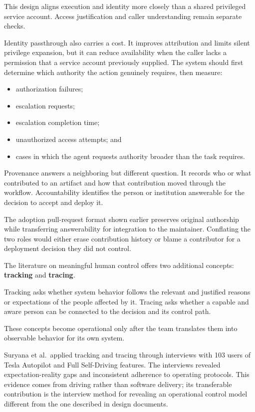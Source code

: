 This design aligns execution and identity more closely than a shared privileged service account. Access justification and caller understanding remain separate checks.


Identity passthrough also carries a cost. It improves attribution and limits silent privilege expansion, but it can reduce availability when the caller lacks a permission that a service account previously supplied. The system should first determine which authority the action genuinely requires, then measure:

\begin{itemize}
\tightlist
\item
  authorization failures;
\item
  escalation requests;
\item
  escalation completion time;
\item
  unauthorized access attempts; and
\item
  cases in which the agent requests authority broader than the task requires.
\end{itemize}

Provenance answers a neighboring but different question. It records who or what contributed to an artifact and how that contribution moved through the workflow. Accountability identifies the person or institution answerable for the decision to accept and deploy it.

The adoption pull-request format shown earlier preserves original authorship while transferring answerability for integration to the maintainer. Conflating the two roles would either erase contribution history or blame a contributor for a deployment decision they did not control.

The literature on meaningful human control offers two additional concepts: \textbf{tracking} and \textbf{tracing}.

Tracking asks whether system behavior follows the relevant and justified reasons or expectations of the people affected by it. Tracing asks whether a capable and aware person can be connected to the decision and its control path.

These concepts become operational only after the team translates them into observable behavior for its own system.

Suryana et al.~applied tracking and tracing through interviews with 103 users of Tesla Autopilot and Full Self-Driving features. The interviews revealed expectation-reality gaps and inconsistent adherence to operating protocols. This evidence comes from driving rather than software delivery; its transferable contribution is the interview method for revealing an operational control model different from the one described in design documents.

